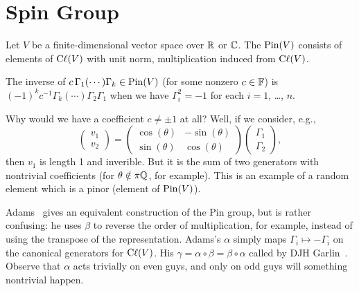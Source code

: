 \section{Spin Group}

\begin{definition}
Let $V$ be a finite-dimensional vector space over $\mathbb{R}$ or $\mathbb{C}$.
The  $\operatorname{Pin}(V)$ consists of elements of $\mathrm{C}\ell(V)$
with unit norm, multiplication induced from $\mathrm{C}\ell(V)$.
\end{definition}

\M
The inverse of $c\, \Gamma_{1}(\cdots)\Gamma_{k}\in\operatorname{Pin}(V)$ (for some nonzero $c\in\mathbb{F}$)
is $(-1)^{k}c^{-1}\Gamma_{k}(\cdots)\Gamma_{2}\Gamma_{1}$ when we have $\Gamma_{i}^{2}=-1$
for each $i=1$, \dots, $n$.

Why would we have a coefficient $c\neq\pm1$ at all? Well, if we
consider, e.g.,
\begin{equation}
\begin{pmatrix}
v_{1}\\ v_{2}
\end{pmatrix} = \begin{pmatrix}\cos(\theta) & -\sin(\theta)\\
\sin(\theta) & \cos(\theta)
\end{pmatrix}
\begin{pmatrix}
\Gamma_{1}\\ \Gamma_{2}
\end{pmatrix},
\end{equation}
then $v_{1}$ is length 1 and inverible. But it is the sum of two
generators with nontrivial coefficients (for $\theta\notin\pi\mathbb{Q}$, for
example). This is an example of a random element which is a pinor
(element of $\operatorname{Pin}(V)$).

\begin{remark}
Adams~\cite{adams1996:ex} gives an equivalent construction of the Pin
group, but is rather confusing: he uses $\beta$ to reverse the order of
multiplication, for example, instead of using the transpose of the
representation. Adams's $\alpha$ simply maps $\Gamma_{i}\mapsto-\Gamma_{i}$ on the
canonical generators for $\mathrm{C}\ell(V)$. His
$\gamma=\alpha\circ\beta=\beta\circ\alpha$ called 
by DJH Garlin~\cite[pg.94]{Garling:2011zz}. Observe that $\alpha$ acts
trivially on even guys, and only on odd guys will something nontrivial
happen. 
\end{remark}


